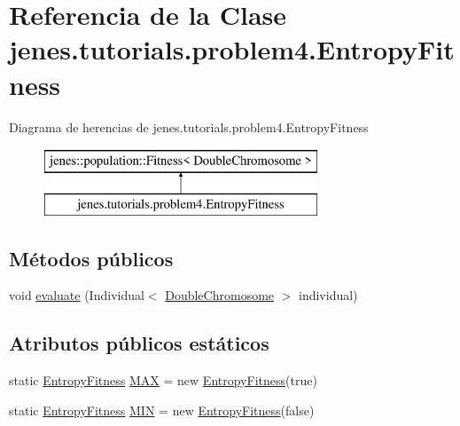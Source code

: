 \hypertarget{classjenes_1_1tutorials_1_1problem4_1_1_entropy_fitness}{\section{Referencia de la Clase jenes.\-tutorials.\-problem4.\-Entropy\-Fitness}
\label{classjenes_1_1tutorials_1_1problem4_1_1_entropy_fitness}
}
Diagrama de herencias de jenes.\-tutorials.\-problem4.\-Entropy\-Fitness\begin{figure}[H]
\begin{center}
\leavevmode
\includegraphics[height=2.000000cm]{classjenes_1_1tutorials_1_1problem4_1_1_entropy_fitness}
\end{center}
\end{figure}
\subsection*{Métodos públicos}
\begin{DoxyCompactItemize}
\item 
void \hyperlink{classjenes_1_1tutorials_1_1problem4_1_1_entropy_fitness_a0e101073e060b84386ee2c10eb80a2f0}{evaluate} (Individual$<$ \hyperlink{classjenes_1_1chromosome_1_1_double_chromosome}{Double\-Chromosome} $>$ individual)
\end{DoxyCompactItemize}
\subsection*{Atributos públicos estáticos}
\begin{DoxyCompactItemize}
\item 
static \hyperlink{classjenes_1_1tutorials_1_1problem4_1_1_entropy_fitness}{Entropy\-Fitness} \hyperlink{classjenes_1_1tutorials_1_1problem4_1_1_entropy_fitness_a015b775a1b2b1f1d5bc1eb82a560fe9a}{M\-A\-X} = new \hyperlink{classjenes_1_1tutorials_1_1problem4_1_1_entropy_fitness}{Entropy\-Fitness}(true)
\item 
static \hyperlink{classjenes_1_1tutorials_1_1problem4_1_1_entropy_fitness}{Entropy\-Fitness} \hyperlink{classjenes_1_1tutorials_1_1problem4_1_1_entropy_fitness_ab9c1db9f5da22216604985e98b6fc7e4}{M\-I\-N} = new \hyperlink{classjenes_1_1tutorials_1_1problem4_1_1_entropy_fitness}{Entropy\-Fitness}(false)
\end{DoxyCompactItemize}


